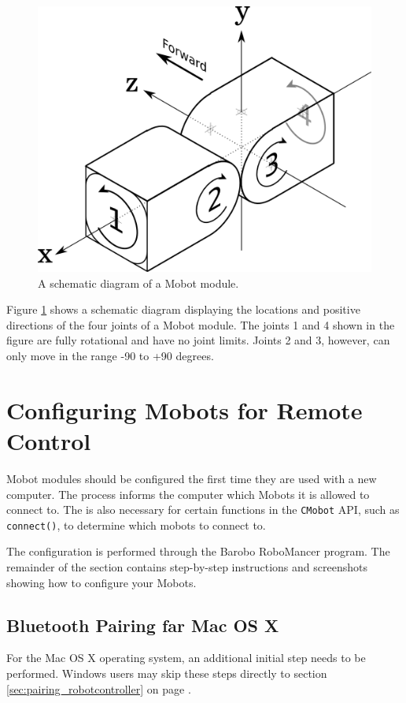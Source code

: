 \documentclass{article}
\begin{document}
\begin{figure}[H]
\begin{center}
\includegraphics[width=4.5in]{images/joint_diagram_verbose.png}
\end{center}
\caption{\label{fig:joint_diagram_verbose.png} A schematic diagram of a Mobot module.}
\end{figure}

Figure \ref{fig:joint_diagram_verbose.png} shows a schematic diagram displaying the
locations and positive directions of the four joints of a Mobot module. The
joints 1 and 4 shown in the figure are fully rotational and have no joint limits.
Joints 2 and 3, however, can only move in the range -90 to +90 degrees.

\section{\label{sec:pairing}Configuring Mobots for Remote Control}
Mobot modules should be configured the first time they are used with 
a new computer. The process informs the computer which Mobots it
is allowed to connect to. The is also necessary for certain 
functions in the \texttt{CMobot} API, such as \texttt{connect()},
to determine which mobots to connect to.

The configuration is performed through the Barobo RoboMancer
program. The remainder of the section contains step-by-step instructions
and screenshots showing how to configure your Mobots.

\subsection{Bluetooth Pairing far Mac OS X}
For the Mac OS X operating system, an additional initial step needs to be performed.
Windows users may skip these steps directly to section \ref{sec:pairing_robotcontroller}
on page \pageref{sec:pairing_robotcontroller}.
\end{document}
